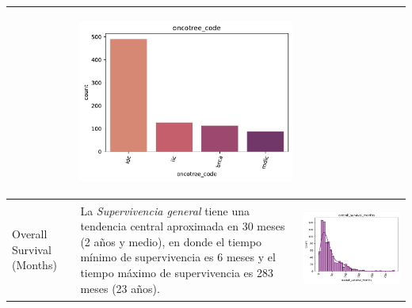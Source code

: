 \begin{table}[!htb]
\begin{threeparttable}
\begin{tabular}{p{2.5cm} p{7cm} p{6.5cm}}
			& \begin{center}\includegraphics[width=1\linewidth]{NOTEBOOK/IMAGENES_DESCRIPTIVAS/31_oncotree_code}\end{center}
			\\ \hline
			
			Overall Survival (Months)
			& La \textit{Supervivencia general} tiene una tendencia central aproximada en 30 meses (2 años y medio), en donde el tiempo mínimo de supervivencia es 6 meses y el tiempo máximo de supervivencia es 283 meses (23 años).
			
			& \begin{center}\includegraphics[width=1\linewidth]{NOTEBOOK/IMAGENES_DESCRIPTIVAS/32_overall_survival_months}\end{center}
			\\ \hline
			

\end{tabular}
\end{threeparttable}
\end{table}
